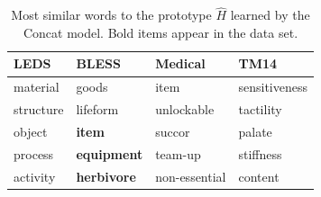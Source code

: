 \documentclass[letterpaper]{article}
\begin{document}
\begin{table}
\begin{center}
  \begin{small}
  \begin{tabular}{|llll|}
    \hline
    LEDS & BLESS & Medical & TM14\\
    \hline
     material       &      goods             &     item           &      sensitiveness          \\
     structure      &      lifeform          &     unlockable     &      tactility              \\
     object         & {\bf item}             &     succor         &      palate                 \\
     process        & {\bf equipment}        &     team-up        &      stiffness              \\
     activity       & {\bf herbivore}        &     non-essential  &      content                \\
    \hline
  \end{tabular}
  \end{small}
\end{center}
\caption{Most similar words to the prototype $\hat H$ learned by the Concat model. Bold items
appear in the data set.}
\label{tab:wordsim}
\end{table}
\end{document}
